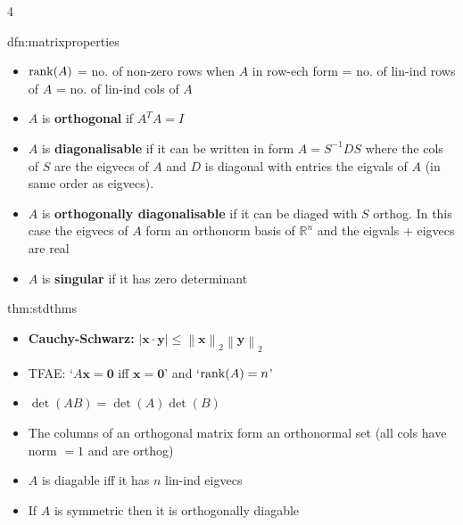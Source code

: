 \documentclass[landscape, 8pt]{extarticle}
\begin{document}
\begin{multicols*}{4}
		
		\begin{dfn}{dfn:matrixproperties}{ }
			\begin{itemize}
				\item $\operatorname{rank}(A)$ = no. of non-zero rows when $A$ in row-ech form = no. of lin-ind rows of $A$ = no. of lin-ind cols of $A$
				\item $A$ is \textbf{orthogonal} if $A^TA = I$
				\item $A$ is \textbf{diagonalisable} if it can be written in form $A = S^{-1}DS$ where the cols of $S$ are the eigvecs of $A$ and $D$ is diagonal with entries the eigvals of $A$ (in same order as eigvecs).
				\item $A$ is \textbf{orthogonally diagonalisable} if it can be diaged with $S$ orthog. In this case the eigvecs of $A$ form an orthonorm basis of $\mathbb{R}^n$ and the eigvals + eigvecs are real
				\item $A$ is \textbf{singular} if it has zero determinant
			\end{itemize}
			
		\end{dfn}
		
		
		\begin{thm}{thm:stdthms}{ }
			\begin{itemize}
				\item \textbf{Cauchy-Schwarz:} $\left|\mathbf{x} \cdot \mathbf{y}\right| \le \left\lVert \mathbf{x}\right\rVert_2 \left\lVert \mathbf{y}\right\rVert_2$
				\item TFAE: `$A\mathbf{x} = \mathbf{0}$ iff $\mathbf{x} = \mathbf{0}$' and `$\operatorname{rank}(A) = n$'
				\item $\det(AB) = \det(A)\det(B)$
				\item The columns of an orthogonal matrix form an orthonormal set (all cols have norm $=1$ and are orthog)
				\item $A$ is diagable iff it has $n$ lin-ind eigvecs
				\item If $A$ is symmetric then it is orthogonally diagable
			\end{itemize}
			
		\end{thm}
		

\end{multicols*}
\end{document}
